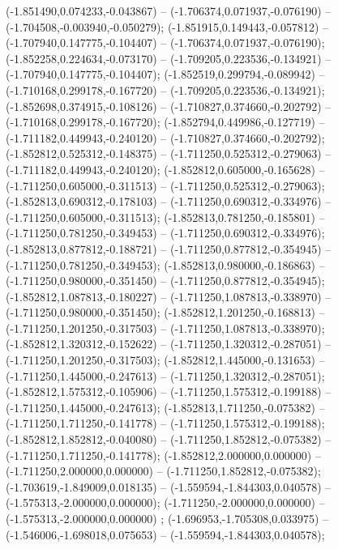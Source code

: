  (-1.851490,0.074233,-0.043867) -- (-1.706374,0.071937,-0.076190) -- (-1.704508,-0.003940,-0.050279);
 (-1.851915,0.149443,-0.057812) -- (-1.707940,0.147775,-0.104407) -- (-1.706374,0.071937,-0.076190);
 (-1.852258,0.224634,-0.073170) -- (-1.709205,0.223536,-0.134921) -- (-1.707940,0.147775,-0.104407);
 (-1.852519,0.299794,-0.089942) -- (-1.710168,0.299178,-0.167720) -- (-1.709205,0.223536,-0.134921);
 (-1.852698,0.374915,-0.108126) -- (-1.710827,0.374660,-0.202792) -- (-1.710168,0.299178,-0.167720);
 (-1.852794,0.449986,-0.127719) -- (-1.711182,0.449943,-0.240120) -- (-1.710827,0.374660,-0.202792);
 (-1.852812,0.525312,-0.148375) -- (-1.711250,0.525312,-0.279063) -- (-1.711182,0.449943,-0.240120);
 (-1.852812,0.605000,-0.165628) -- (-1.711250,0.605000,-0.311513) -- (-1.711250,0.525312,-0.279063);
 (-1.852813,0.690312,-0.178103) -- (-1.711250,0.690312,-0.334976) -- (-1.711250,0.605000,-0.311513);
 (-1.852813,0.781250,-0.185801) -- (-1.711250,0.781250,-0.349453) -- (-1.711250,0.690312,-0.334976);
 (-1.852813,0.877812,-0.188721) -- (-1.711250,0.877812,-0.354945) -- (-1.711250,0.781250,-0.349453);
 (-1.852813,0.980000,-0.186863) -- (-1.711250,0.980000,-0.351450) -- (-1.711250,0.877812,-0.354945);
 (-1.852812,1.087813,-0.180227) -- (-1.711250,1.087813,-0.338970) -- (-1.711250,0.980000,-0.351450);
 (-1.852812,1.201250,-0.168813) -- (-1.711250,1.201250,-0.317503) -- (-1.711250,1.087813,-0.338970);
 (-1.852812,1.320312,-0.152622) -- (-1.711250,1.320312,-0.287051) -- (-1.711250,1.201250,-0.317503);
 (-1.852812,1.445000,-0.131653) -- (-1.711250,1.445000,-0.247613) -- (-1.711250,1.320312,-0.287051);
 (-1.852812,1.575312,-0.105906) -- (-1.711250,1.575312,-0.199188) -- (-1.711250,1.445000,-0.247613);
 (-1.852813,1.711250,-0.075382) -- (-1.711250,1.711250,-0.141778) -- (-1.711250,1.575312,-0.199188);
 (-1.852812,1.852812,-0.040080) -- (-1.711250,1.852812,-0.075382) -- (-1.711250,1.711250,-0.141778);
 (-1.852812,2.000000,0.000000) -- (-1.711250,2.000000,0.000000) -- (-1.711250,1.852812,-0.075382);
 (-1.703619,-1.849009,0.018135) -- (-1.559594,-1.844303,0.040578) -- (-1.575313,-2.000000,0.000000);
 (-1.711250,-2.000000,0.000000) -- (-1.575313,-2.000000,0.000000) ;
 (-1.696953,-1.705308,0.033975) -- (-1.546006,-1.698018,0.075653) -- (-1.559594,-1.844303,0.040578);
